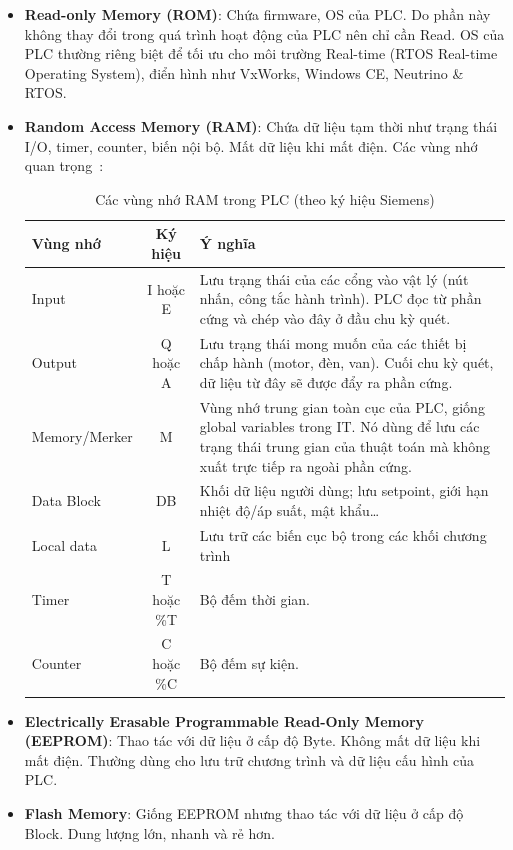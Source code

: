 \documentclass[../main.tex]{subfiles}
\begin{document}
\begin{itemize}
    \item \textbf{Read-only Memory (ROM)}: Chứa firmware, OS của PLC. Do phần này không thay đổi trong quá trình hoạt động của PLC nên chỉ cần Read. OS của PLC thường riêng biệt để tối ưu cho môi trường Real-time (RTOS Real-time Operating System), điển hình như VxWorks, Windows CE, Neutrino \& RTOS.
    \item \textbf{Random Access Memory (RAM)}: Chứa dữ liệu tạm thời như trạng thái I/O, timer, counter, biến nội bộ. Mất dữ liệu khi mất điện.  Các vùng nhớ quan trọng~\cite{snap7_sharp7}:

    \begin{table}[H]
        \centering
        \caption{Các vùng nhớ RAM trong PLC (theo ký hiệu Siemens)}
        \label{tab:plc-memory}
        \begin{tabular}{|l|c|p{7.5cm}|}
            \hline
            \textbf{Vùng nhớ} & \textbf{Ký hiệu} & \textbf{Ý nghĩa} \\
            \hline
            Input & I hoặc E & Lưu trạng thái của các cổng vào vật lý (nút nhấn, công tắc hành trình). PLC đọc từ phần cứng và chép vào đây ở đầu chu kỳ quét. \\
            \hline
            Output & Q hoặc A & Lưu trạng thái mong muốn của các thiết bị chấp hành (motor, đèn, van). Cuối chu kỳ quét, dữ liệu từ đây sẽ được đẩy ra phần cứng. \\
            \hline
            Memory/Merker & M & Vùng nhớ trung gian toàn cục của PLC, giống global variables trong IT. Nó dùng để lưu các trạng thái trung gian của thuật toán mà không xuất trực tiếp ra ngoài phần cứng. \\
            \hline
            Data Block & DB & Khối dữ liệu người dùng; lưu setpoint, giới hạn nhiệt độ/áp suất, mật khẩu\ldots \\
            \hline
            Local data & L & Lưu trữ các biến cục bộ trong các khối chương trình \\
            \hline
            Timer & T hoặc \%T & Bộ đếm thời gian. \\
            \hline
            Counter & C hoặc \%C & Bộ đếm sự kiện. \\
            \hline
        \end{tabular}
    \end{table}


    \item \textbf{Electrically Erasable Programmable Read-Only Memory (EEPROM)}: Thao tác với dữ liệu ở cấp độ Byte. Không mất dữ liệu khi mất điện. Thường dùng cho lưu trữ chương trình và dữ liệu cấu hình của PLC.
    \item \textbf{Flash Memory}: Giống EEPROM nhưng thao tác với dữ liệu ở cấp độ Block. Dung lượng lớn, nhanh và rẻ hơn.
\end{itemize}
\end{document}
